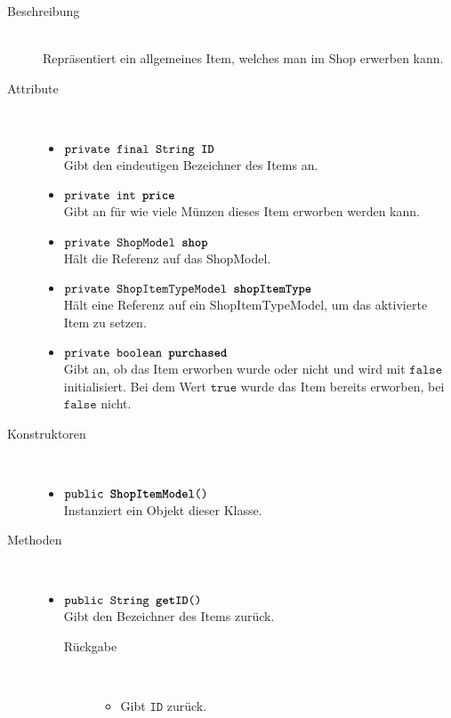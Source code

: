 \begin{description}
\item[Beschreibung] \hfill \\ Repräsentiert ein allgemeines Item, welches man im Shop erwerben kann.

\item[Attribute] \hfill \\
	\vspace{-.8cm}
	\begin{itemize}
		\item $\texttt{private final String \textbf{ID}}$ \\ Gibt den eindeutigen Bezeichner des Items an.
		\item $\texttt{private int \textbf{price}}$ \\ Gibt an für wie viele Münzen dieses Item erworben werden kann.
		\item $\texttt{private ShopModel \textbf{shop}}$ \\ Hält die Referenz auf das ShopModel.
		\item $\texttt{private ShopItemTypeModel \textbf{shopItemType}}$ \\ 	Hält eine Referenz auf ein ShopItemTypeModel, um das aktivierte Item zu setzen.
		\item $\texttt{private boolean \textbf{purchased}}$ \\ Gibt an, ob das Item erworben wurde oder nicht und wird mit $\texttt{false}$ initialisiert. Bei dem Wert $\texttt{true}$ wurde das Item bereits erworben, bei $\texttt{false}$ nicht.
		\end{itemize}
	
\item[Konstruktoren] \hfill \\
	\vspace{-.8cm}
	\begin{itemize}
		\item $\texttt{public \textbf{ShopItemModel}()}$ \\ Instanziert ein Objekt dieser Klasse.

	\end{itemize}
	
\item[Methoden] \hfill \\
	\vspace{-.8cm}
	\begin{itemize}
		\item $\texttt{public String \textbf{getID}()}$ \\ Gibt den Bezeichner des Items zurück.
		\begin{description}
			\item[Rückgabe] \hfill \\
			\vspace{-.8cm}
			\begin{itemize}
				\item Gibt $\texttt{ID}$ zurück.
			\end{itemize}
			\end{description}
		

\end{itemize}
\end{description}

